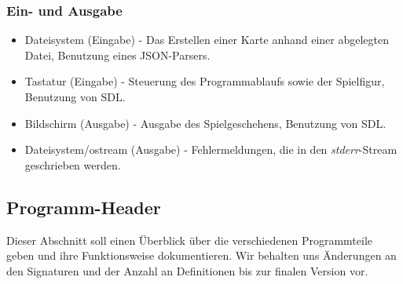 \documentclass[11pt,a4paper,notitlepage]{report}
\begin{document}
			\subsubsection*{Ein- und Ausgabe}
			\begin{itemize}
				\item Dateisystem (Eingabe) - Das Erstellen einer Karte anhand einer abgelegten Datei, Benutzung eines JSON-Parsers.
				\item Tastatur (Eingabe) - Steuerung des Programmablaufs sowie der Spielfigur, Benutzung von SDL.
				\item Bildschirm (Ausgabe) - Ausgabe des Spielgeschehens, Benutzung von SDL.
				\item Dateisystem/ostream (Ausgabe) - Fehlermeldungen, die in den \textit{stderr}-Stream geschrieben werden.
			\end{itemize}
			\newpage
			\subsection*{Programm-Header}
			Dieser Abschnitt soll einen Überblick über die verschiedenen Programmteile geben und ihre Funktionsweise dokumentieren. Wir behalten uns Änderungen an den Signaturen und der Anzahl an Definitionen bis zur finalen Version vor.
\end{document}
